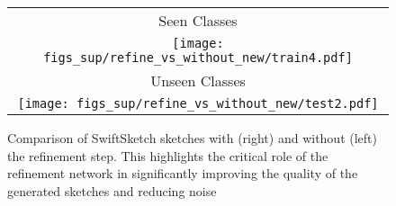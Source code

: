 

\begin{figure*}[t]
    \centering
    \setlength{\tabcolsep}{1pt}
    {\small
    \begin{tabular}{c}
         Seen Classes  \\
        \texttt{[image: figs\_sup/refine\_vs\_without\_new/train4.pdf]}   \\
         Unseen Classes  \\
        \texttt{[image: figs\_sup/refine\_vs\_without\_new/test2.pdf]}   \\
    
    \end{tabular}
    }
    \caption{Comparison of SwiftSketch sketches with (right) and without (left) the refinement step. This highlights the critical role of the refinement network in significantly improving the quality of the generated sketches and reducing noise}
    \label{fig:comparison_refine}
\end{figure*}
